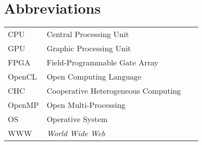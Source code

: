 \chapter*{Abbreviations}

\begin{flushleft}
\begin{tabular}{l p{0.8\linewidth}}
CPU			& Central Processing Unit\\
GPU			& Graphic Processing Unit\\
FPGA		& Field-Programmable Gate Array\\
OpenCL		& Open Computing Language\\
CHC			& Cooperative Heterogeneous Computing\\
OpenMP		& Open Multi-Processing\\
OS			& Operative System\\

WWW      & \emph{World Wide Web}
\end{tabular}
\end{flushleft}

